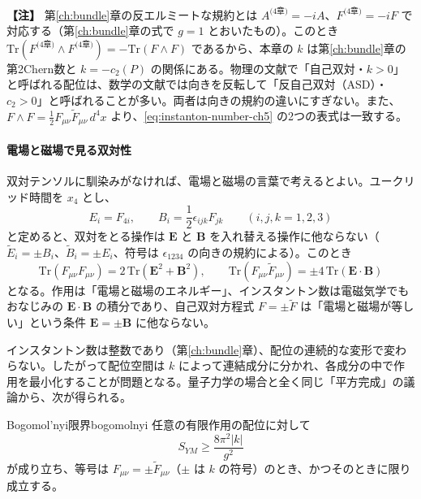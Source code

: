 \documentclass[uplatex, dvipdfmx, book]{jsbook}
\newenvironment{note}{\vspace{1ex}\par\footnotesize\noindent\textbf{【注】}}{\par\vspace{1ex}}
\begin{document}
\begin{note}
第\ref{ch:bundle}章の反エルミートな規約とは $A^{\text{(4章)}} = -iA$、$F^{\text{(4章)}} = -iF$ で対応する（第\ref{ch:bundle}章の式で $g = 1$ とおいたもの）。このとき $\mathrm{Tr}(F^{\text{(4章)}} \wedge F^{\text{(4章)}}) = -\mathrm{Tr}(F \wedge F)$ であるから、本章の $k$ は第\ref{ch:bundle}章の第2Chern数と $k = -c_2(P)$ の関係にある。物理の文献で「自己双対・$k > 0$」と呼ばれる配位は、数学の文献では向きを反転して「反自己双対（ASD）・$c_2 > 0$」と呼ばれることが多い。両者は向きの規約の違いにすぎない。また、$F \wedge F = \frac{1}{2}F_{\mu\nu}\tilde{F}_{\mu\nu}\, d^4x$ より、\eqref{eq:instanton-number-ch5} の2つの表式は一致する。
\end{note}

\paragraph{電場と磁場で見る双対性}
双対テンソルに馴染みがなければ、電場と磁場の言葉で考えるとよい。ユークリッド時間を $x_4$ とし、
\begin{equation}
    E_i = F_{4i}, \qquad B_i = \frac{1}{2}\epsilon_{ijk}F_{jk} \qquad (i, j, k = 1, 2, 3)
\end{equation}
と定めると、双対をとる操作は $\bm{E}$ と $\bm{B}$ を入れ替える操作に他ならない（$\tilde{E}_i = \pm B_i$、$\tilde{B}_i = \pm E_i$、符号は $\epsilon_{1234}$ の向きの規約による）。このとき
\begin{equation}
    \mathrm{Tr}(F_{\mu\nu}F_{\mu\nu}) = 2\,\mathrm{Tr}(\bm{E}^2 + \bm{B}^2), \qquad \mathrm{Tr}(F_{\mu\nu}\tilde{F}_{\mu\nu}) = \pm 4\,\mathrm{Tr}(\bm{E}\cdot\bm{B})
\end{equation}
となる。作用は「電場と磁場のエネルギー」、インスタントン数は電磁気学でもおなじみの $\bm{E}\cdot\bm{B}$ の積分であり、自己双対方程式 $F = \pm\tilde{F}$ は「電場と磁場が等しい」という条件 $\bm{E} = \pm\bm{B}$ に他ならない。

インスタントン数は整数であり（第\ref{ch:bundle}章）、配位の連続的な変形で変わらない。したがって配位空間は $k$ によって連結成分に分かれ、各成分の中で作用を最小化することが問題となる。量子力学の場合と全く同じ「平方完成」の議論から、次が得られる。

\begin{myprop}{Bogomol'nyi限界}{bogomolnyi}
任意の有限作用の配位に対して
\begin{equation*}
    S_{YM} \ge \frac{8\pi^2 |k|}{g^2}
\end{equation*}
が成り立ち、等号は $F_{\mu\nu} = \pm \tilde{F}_{\mu\nu}$（$\pm$ は $k$ の符号）のとき、かつそのときに限り成立する。
\end{myprop}
\end{document}
